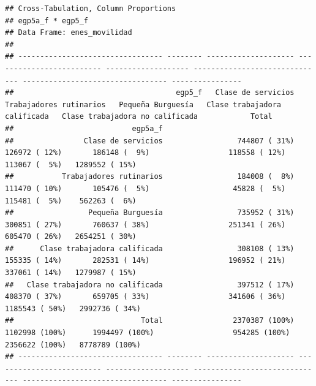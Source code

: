 \documentclass[
]{book}
\newenvironment{Shaded}{\begin{snugshade}}{\end{snugshade}}
\newcommand{\AttributeTok}[1]{\textcolor[rgb]{0.77,0.63,0.00}{#1}}
\newcommand{\DecValTok}[1]{\textcolor[rgb]{0.00,0.00,0.81}{#1}}
\newcommand{\FunctionTok}[1]{\textcolor[rgb]{0.00,0.00,0.00}{#1}}
\newcommand{\NormalTok}[1]{#1}
\newcommand{\SpecialCharTok}[1]{\textcolor[rgb]{0.00,0.00,0.00}{#1}}
\newcommand{\StringTok}[1]{\textcolor[rgb]{0.31,0.60,0.02}{#1}}
\begin{document}
\begin{Shaded}
\end{Shaded}

\begin{verbatim}
## Cross-Tabulation, Column Proportions  
## egp5a_f * egp5_f  
## Data Frame: enes_movilidad  
## 
## --------------------------------- -------- -------------------- ------------------------- ------------------- ------------------------------ --------------------------------- ----------------
##                                     egp5_f   Clase de servicios   Trabajadores rutinarios   Pequeña Burguesía   Clase trabajadora calificada   Clase trabajadora no calificada            Total
##                           egp5a_f                                                                                                                                                              
##                Clase de servicios                 744807 ( 31%)             126972 ( 12%)       186148 (  9%)                  118558 ( 12%)                     113067 (  5%)   1289552 ( 15%)
##           Trabajadores rutinarios                 184008 (  8%)             111470 ( 10%)       105476 (  5%)                   45828 (  5%)                     115481 (  5%)    562263 (  6%)
##                 Pequeña Burguesía                 735952 ( 31%)             300851 ( 27%)       760637 ( 38%)                  251341 ( 26%)                     605470 ( 26%)   2654251 ( 30%)
##      Clase trabajadora calificada                 308108 ( 13%)             155335 ( 14%)       282531 ( 14%)                  196952 ( 21%)                     337061 ( 14%)   1279987 ( 15%)
##   Clase trabajadora no calificada                 397512 ( 17%)             408370 ( 37%)       659705 ( 33%)                  341606 ( 36%)                    1185543 ( 50%)   2992736 ( 34%)
##                             Total                2370387 (100%)            1102998 (100%)      1994497 (100%)                  954285 (100%)                    2356622 (100%)   8778789 (100%)
## --------------------------------- -------- -------------------- ------------------------- ------------------- ------------------------------ --------------------------------- ----------------
\end{verbatim}
\end{document}
